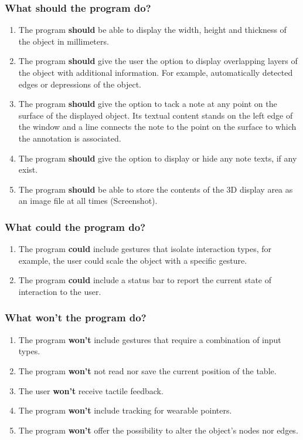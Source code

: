 \documentclass[12pt]{extarticle}
\begin{document}
\subsubsection{What should the program do?}
\begin{enumerate}
\item
The program \textbf{should} be able to display the width, height and thickness of the object in millimeters.
\item
The program \textbf{should} give the user the option to display overlapping layers of the object with additional information. For example, automatically detected edges or depressions of the object.
\item
The program \textbf{should} give the option to tack a note at any point on the surface of the displayed object. Its textual content stands on the left edge of the window and a line connects the note to the point on the surface to which the annotation is associated.
\item
The program \textbf{should} give the option to display or hide any note texts, if any exist.
\item
The program \textbf{should} be able to store the contents of the 3D display area as an image file at all times (Screenshot).
\end{enumerate}

\subsubsection{What could the program do?}
\begin{enumerate}
\item
The program \textbf{could} include gestures that isolate interaction types, for example, the user could scale the object with a specific gesture.
\item
The program \textbf{could} include a status bar to report the current state of interaction to the user.
\end{enumerate}

\subsubsection{What won't the program do?}
\begin{enumerate}
\item
The program \textbf{won't} include gestures that require a combination of input types.
\item
The program \textbf{won't} not read nor save the current position of the table.
\item
The user \textbf{won't} receive tactile feedback.
\item
The program \textbf{won't} include tracking for wearable pointers.
\item
The program \textbf{won't} offer the possibility to alter the object's nodes nor edges.
\end{enumerate}
\end{document}
